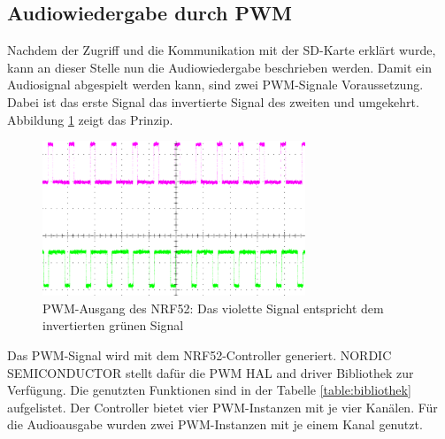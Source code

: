 \subsection{Audiowiedergabe durch PWM}\label{sec:audioPWM}
Nachdem der Zugriff und die Kommunikation mit der SD-Karte erklärt wurde, kann an dieser Stelle nun die Audiowiedergabe beschrieben werden. Damit ein Audiosignal abgespielt werden kann, sind zwei PWM-Signale Voraussetzung. Dabei ist das erste Signal das invertierte Signal des zweiten und umgekehrt. Abbildung \ref{fig:pwm_ausgang} zeigt das Prinzip.

\begin{figure}[H]
	\begin{center}
		\includegraphics[width=0.7\textwidth]{data/PWM_Signal_500Hz_Mono}
		\caption[PWM-Ausgang des NRF52]{PWM-Ausgang des NRF52: Das violette Signal entspricht dem invertierten grünen Signal} %
		\label{fig:pwm_ausgang}
	\end{center}
\end{figure}

Das PWM-Signal wird mit dem NRF52-Controller generiert. NORDIC SEMICONDUCTOR stellt dafür die PWM HAL and driver Bibliothek zur Verfügung. Die genutzten Funktionen sind in der Tabelle \ref{table:bibliothek} aufgelistet. Der Controller bietet vier PWM-Instanzen mit je vier Kanälen. Für die Audioausgabe wurden zwei PWM-Instanzen mit je einem Kanal genutzt.

